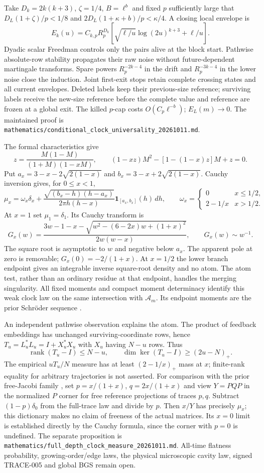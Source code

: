 Take $D_k=2k(k+3)$, $\zeta=1/4$, $B=\ell^b$ and fixed $p$ sufficiently
large that $D_L(1+\zeta)/p<1/8$ and
$2D_L(1+\kappa+b)/p<\kappa/4$. A closing local envelope is
\[
 E_k(u)=C_{k,p}R_p^{D_k}
       \left[\sqrt{\ell/u}\log(2u)^{k+3}+\ell/u\right].
\]
Dyadic scalar Freedman controls only the pairs alive at the block start.
Pathwise absolute-row stability propagates their raw noise without
future-dependent martingale transforms. Spare powers
$R_p^{-2k-4}$ in the drift and $R_p^{-3k-4}$ in the lower noise close
the induction. Joint first-exit stops retain complete crossing states and
all current envelopes. Deleted labels keep their previous-size reference;
surviving labels receive the new-size reference before the complete value
and reference are frozen at a global exit.
The killed $p$-cap costs $O(C_p\ell^{-b})$;
$E_L(m)\to0$. The maintained proof is
\texttt{mathematics/conditional\_clock\_universality\_20261011.md}.

The formal characteristics give
\[
 z=\frac{M(1-M)}{(1+M)(1-xM)},\qquad
 (1-xz)M^2-[1-(1-x)z]M+z=0.
\]
Put $a_x=3-x-2\sqrt{2(1-x)}$ and
$b_x=3-x+2\sqrt{2(1-x)}$. Cauchy inversion gives, for $0\le x<1$,
\[
 \mu_x=\omega_x\delta_x+
 \frac{\sqrt{(b_x-h)(h-a_x)}}{2\pi h(h-x)}
       \mathbf1_{[a_x,b_x]}(h)\,dh,\qquad
 \omega_x=\begin{cases}0&x\le1/2,\\2-1/x&x>1/2.\end{cases}
\]
At $x=1$ set $\mu_1=\delta_1$. Its Cauchy transform is
\[
 G_x(w)=\frac{3w-1-x-\sqrt{w^2-(6-2x)w+(1+x)^2}}{2w(w-x)},
 \qquad G_x(w)\sim w^{-1}.
\]
The square root is asymptotic to $w$ and negative below $a_x$.
The apparent pole at zero is removable; $G_x(0)=-2/(1+x)$.
At $x=1/2$ the lower branch endpoint gives an integrable inverse
square-root density and no atom. The atom test, rather than an ordinary
residue at that endpoint, handles the merging singularity.
All fixed moments and compact moment determinacy identify this weak clock
law on the same intersection with $\mathcal A_m$. Its endpoint moments
are the prior Schr\"oder sequence \cite{CMSV2016Clock}.

An independent pathwise observation explains the atom. The product of
feedback embeddings has unchanged surviving-coordinate rows, hence
$T_u=L_u^*L_u=I+X_u^*X_u$ with $X_u$ having $N-u$ rows. Thus
\[
 \operatorname{rank}(T_u-I)\le N-u,
 \qquad \dim\ker(T_u-I)\ge(2u-N)_+.
\]
The empirical $uT_u/N$ measure has at least $(2-1/x)_+$ mass at $x$;
finite-rank equality for arbitrary trajectories is not asserted.
For comparison with the prior free-Jacobi family \cite{Hamdi2017Clock},
set $p=x/(1+x)$, $q=2x/(1+x)$ and view $Y=PQP$ in the normalized
$P$ corner for free reference projections of traces $p,q$.
Subtract $(1-p)\delta_0$ from the full-trace law and divide by $p$.
Then $x/Y$ has precisely $\mu_x$; this dictionary makes no claim of
freeness of the actual matrices. Its $x=0$ limit is established directly
by the Cauchy formula, since the corner with $p=0$ is undefined.
The separate proposition is
\texttt{mathematics/full\_depth\_clock\_measure\_20261011.md}.
All-time flatness probability, growing-order/edge laws, the physical
microscopic cavity law, signed TRACE-005 and global BGS remain open.

